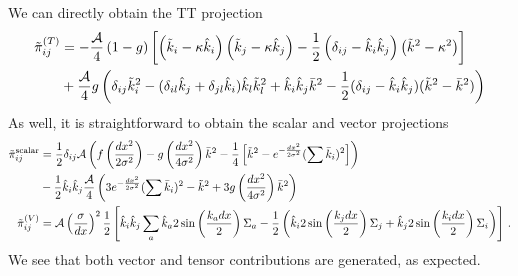 \documentclass{revtex4}
\begin{document}
We can directly obtain the TT projection
\begin{align}
  \tilde{\pi}_{ij}^{(T)} &= -\frac{\mathcal{A}}{4}\left(1-g\right)\left[\left(\tilde{k}_i-\kappa\hat{k}_i\right)\left(\tilde{k}_j-\kappa\hat{k}_j\right) - \frac{1}{2}\left(\delta_{ij}-\hat{k}_i\hat{k}_j\right)\left(\tilde{k}^2-\kappa^2\right)\right] \notag \\
  &+ \frac{\mathcal{A}}{4}g\left(\delta_{ij}\tilde{k}_i^2 - (\delta_{il}\hat{k}_j+\delta_{jl}\hat{k}_i)\hat{k}_l\tilde{k}_l^2 + \hat{k}_i\hat{k}_j\bar{k}^2 - \frac{1}{2}(\delta_{ij}-\hat{k}_i\hat{k}_j)(\tilde{k}^2-\bar{k}^2)\right)
\end{align}
As well, it is straightforward to obtain the scalar and vector projections
\begin{subequations}
  \begin{align}
    \tilde{\pi}_{ij}^{\rm scalar} &= \frac{1}{2}\delta_{ij}\mathcal{A}\left(f\left(\frac{dx^2}{2\sigma^2}\right) - g\left(\frac{dx^2}{4\sigma^2}\right)\bar{k}^2 - \frac{1}{4}\left[ \tilde{k}^2 - e^{-\frac{dx^2}{2\sigma^2}}(\sum \bar{k}_i)^2\right]\right) \\
       &- \frac{1}{2}\hat{k}_i\hat{k}_j\frac{\mathcal{A}}{4}\left(3e^{-\frac{dx^2}{2\sigma^2}}(\sum\bar{k}_i)^2 - \tilde{k}^2 + 3g\left(\frac{dx^2}{4\sigma^2}\right)\bar{k}^2 \right) \\
    \tilde{\pi}_{ij}^{(V)} &= \mathcal{A}\left(\frac{\sigma}{dx}\right)^2\frac{1}{2}\left[\hat{k}_i\hat{k}_j\sum_a\hat{k}_a2\sin\left(\frac{k_adx}{2}\right)\Sigma_a - \frac{1}{2}\left(\hat{k}_i2\sin\left(\frac{k_jdx}{2}\right)\Sigma_j + \hat{k}_j2\sin\left(\frac{k_idx}{2}\right)\Sigma_i\right) \right] \, .\\
  \end{align}
\end{subequations}
We see that both vector and tensor contributions are generated, as expected.
\end{document}
